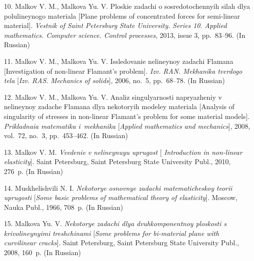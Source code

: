 {10. Malkov V. M., Malkova Yu. V. Ploskie zadachi o
sosredotochennyih silah dlya polulineynogo materiala [Plane
problems of concentrated forces for semi-linear material]. {\it
Vestnik of Saint Petersburg State University. Series 10. Applied
mathematics. Computer science. Control processes}, 2013, issue 3,
pp.~83--96. (In Russian)

11. Malkov V. M., Malkova Yu. V. Issledovanie nelineynoy zadachi
Flamana [Investigation of non-linear Flamant's problem]. {\it Izv.
RAN. Mekhanika tverdogo tela} [{\it Izv. RAS. Mechanics of
solids}], 2006, no.~5, pp.~68--78. (In Russian)

12. Malkov V. M., Malkova Yu. V. Analiz singulyarnosti
napryazheniy v nelineynoy zadache Flamana dlya nekotoryih modeley
materiala [Analysis of singularity of stresses in non-linear
Flamant's problem for some material models]. {\it Prikladnaia
matematika i~mekhanika} [{\it Applied mathematics and mechanics}],
2008, vol.~72, no.~3, pp.~453--462. (In Russian)

13. Malkov V. M. {\it Vvedenie v nelineynuyu uprugost} [{\it
Introduction in non-linear elasticity}]. Saint Petersburg, Saint
Petersburg State University Publ., 2010, 276~p. (In Russian)

14. Muskhelishvili N. I. {\it Nekotorye osnovnye zadachi
matematicheskoy teorii uprugosti} [{\it Some basic problems of
mathematical theory of elasticity}]. Moscow,  Nauka Publ., 1966,
708~p. (In Russian)

15. Malkova Yu. V. {\it Nekotorye zadachi dlya dvuhkomponentnoy
ploskosti s krivolineynyimi treshchinami} [{\it Some problems for
bi-material plane with curvilinear cracks}]. Saint Petersburg,
Saint Petersburg State University Publ., 2008, 160~p. (In Russian)



}
